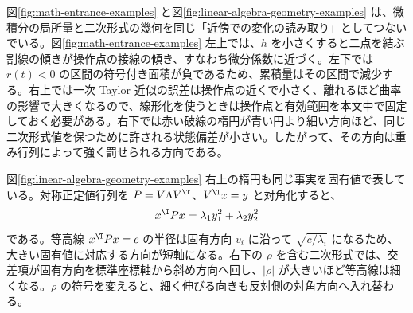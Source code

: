 図\ref{fig:math-entrance-examples} と図\ref{fig:linear-algebra-geometry-examples} は、微積分の局所量と二次形式の幾何を同じ「近傍での変化の読み取り」としてつないでいる。図\ref{fig:math-entrance-examples} 左上では、$h$ を小さくすると二点を結ぶ割線の傾きが操作点の接線の傾き、すなわち微分係数に近づく。左下では $r(t)<0$ の区間の符号付き面積が負であるため、累積量はその区間で減少する。右上では一次 Taylor 近似の誤差は操作点の近くで小さく、離れるほど曲率の影響で大きくなるので、線形化を使うときは操作点と有効範囲を本文中で固定しておく必要がある。右下では赤い破線の楕円が青い円より細い方向ほど、同じ二次形式値を保つために許される状態偏差が小さい。したがって、その方向は重み行列によって強く罰せられる方向である。

図\ref{fig:linear-algebra-geometry-examples} 右上の楕円も同じ事実を固有値で表している。対称正定値行列を $P=V\Lambda V^\T$、$V^\T x=y$ と対角化すると、
\begin{equation}
  x^\T Px
  =
  \lambda_1y_1^2+\lambda_2y_2^2
\end{equation}
である。等高線 $x^\T Px=c$ の半径は固有方向 $v_i$ に沿って $\sqrt{c/\lambda_i}$ になるため、大きい固有値に対応する方向が短軸になる。右下の $\rho$ を含む二次形式では、交差項が固有方向を標準座標軸から斜め方向へ回し、$|\rho|$ が大きいほど等高線は細くなる。$\rho$ の符号を変えると、細く伸びる向きも反対側の対角方向へ入れ替わる。
